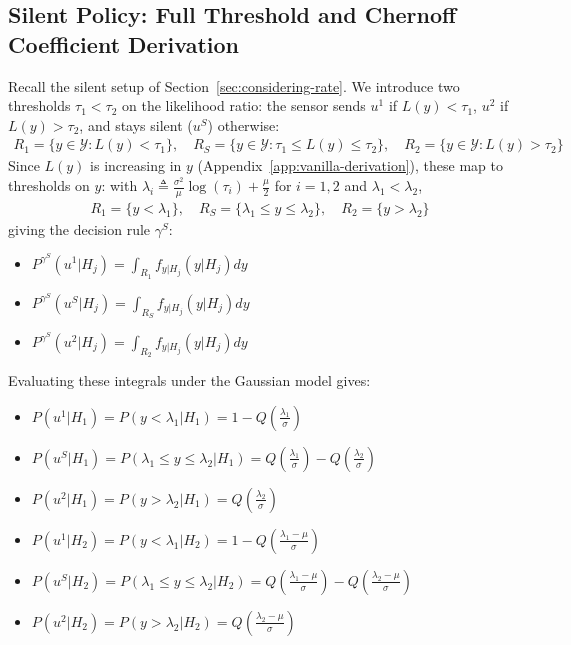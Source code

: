 \documentclass[11pt]{article}
\begin{document}
\subsection{Silent Policy: Full Threshold and Chernoff Coefficient Derivation}
\label{app:silent-derivation}
Recall the silent setup of Section~\ref{sec:considering-rate}. We introduce two thresholds $\tau_1 < \tau_2$ on the likelihood ratio: the sensor sends $u^1$ if $L(y) < \tau_1$, $u^2$ if $L(y) > \tau_2$, and stays silent ($u^S$) otherwise:
\begin{align*}
    R_1 = \{y \in \mathcal{Y}: L(y) < \tau_1\}, \quad R_S = \{y \in \mathcal{Y}: \tau_1 \leq L(y) \leq \tau_2\}, \quad R_2 = \{y \in \mathcal{Y}: L(y) > \tau_2\}
\end{align*}
Since $L(y)$ is increasing in $y$ (Appendix~\ref{app:vanilla-derivation}), these map to thresholds on $y$: with $\lambda_i \triangleq \frac{\sigma^2}{\mu}\log(\tau_i) + \frac{\mu}{2}$ for $i=1,2$ and $\lambda_1 < \lambda_2$,
\begin{align*}
    R_1 = \{y < \lambda_1\}, \quad R_S = \{\lambda_1 \leq y \leq \lambda_2\}, \quad R_2 = \{y > \lambda_2\}
\end{align*}
giving the decision rule $\gamma^S$:
\begin{itemize}
    \item $P^{\gamma^S}(u^1|H_j) = \int_{R_1}f_{y|H_j}(y|H_j)dy$
    \item $P^{\gamma^S}(u^S|H_j) = \int_{R_S}f_{y|H_j}(y|H_j)dy$
    \item $P^{\gamma^S}(u^2|H_j) = \int_{R_2}f_{y|H_j}(y|H_j)dy$
\end{itemize}
Evaluating these integrals under the Gaussian model gives:
\begin{itemize}
    \item $P(u^1|H_1) = P(y<\lambda_1|H_1) = 1-Q(\frac{\lambda_1}{\sigma})$
    \item $P(u^S|H_1) = P(\lambda_1\leq y\leq\lambda_2|H_1) = Q(\frac{\lambda_1}{\sigma}) - Q(\frac{\lambda_2}{\sigma})$
    \item $P(u^2|H_1) = P(y>\lambda_2|H_1) = Q(\frac{\lambda_2}{\sigma})$
    \item $P(u^1|H_2) = P(y<\lambda_1|H_2) = 1-Q(\frac{\lambda_1-\mu}{\sigma})$
    \item $P(u^S|H_2) = P(\lambda_1\leq y\leq\lambda_2|H_2) = Q(\frac{\lambda_1-\mu}{\sigma}) - Q(\frac{\lambda_2-\mu}{\sigma})$
    \item $P(u^2|H_2) = P(y>\lambda_2|H_2) = Q(\frac{\lambda_2-\mu}{\sigma})$
\end{itemize}
\end{document}
